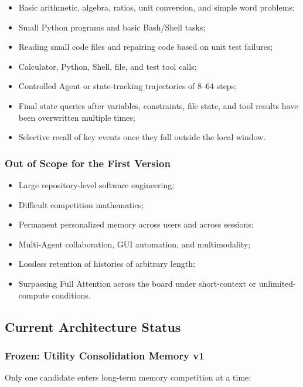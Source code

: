 \begin{itemize}
  \item Basic arithmetic, algebra, ratios, unit conversion, and simple word problems;
  \item Small Python programs and basic Bash/Shell tasks;
  \item Reading small code files and repairing code based on unit test failures;
  \item Calculator, Python, Shell, file, and test tool calls;
  \item Controlled Agent or state-tracking trajectories of 8--64 steps;
  \item Final state queries after variables, constraints, file state, and tool results have been overwritten multiple times;
  \item Selective recall of key events once they fall outside the local window.
\end{itemize}

\subsubsection{Out of Scope for the First Version}

\begin{itemize}
  \item Large repository-level software engineering;
  \item Difficult competition mathematics;
  \item Permanent personalized memory across users and across sessions;
  \item Multi-Agent collaboration, GUI automation, and multimodality;
  \item Lossless retention of histories of arbitrary length;
  \item Surpassing Full Attention across the board under short-context or unlimited-compute conditions.
\end{itemize}

\subsection{Current Architecture Status}

\subsubsection{Frozen: Utility Consolidation Memory v1}

Only one candidate enters long-term memory competition at a time:

